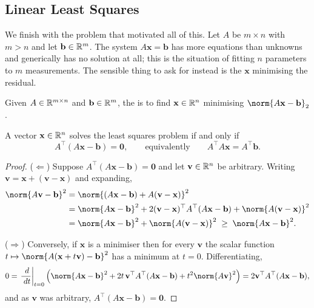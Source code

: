 \documentclass[a4paper]{scrartcl}
\begin{document}
\subsection{Linear Least Squares}

We finish with the problem that motivated all of this. Let $A$ be $m\times n$ with $m > n$ and let $\mathbf b\in\mathbb{R}^m$. The system $A\mathbf x = \mathbf b$ has more equations than unknowns and generically has no solution at all; this is the situation of fitting $n$ parameters to $m$ measurements. The sensible thing to ask for instead is the $\mathbf x$ minimising the residual.

\begin{definition}
  Given $A \in \mathbb{R}^{m\times n}$ and $\mathbf b\in\mathbb{R}^m$, the  is to find $\mathbf x\in\mathbb{R}^n$ minimising $\norm{A\mathbf x - \mathbf b}_2$.
\end{definition}

\begin{theorem}\label{thm:normaleq}
  A vector $\mathbf x\in\mathbb{R}^n$ solves the least squares problem if and only if
  $$
  A^\top(A\mathbf x - \mathbf b) = \mathbf 0, \qquad \text{equivalently} \qquad A^\top A\mathbf x = A^\top \mathbf b .
  $$
\end{theorem}
\begin{proof}
  ($\Leftarrow$) Suppose $A^\top(A\mathbf x - \mathbf b) = \mathbf 0$ and let $\mathbf v\in\mathbb{R}^n$ be arbitrary. Writing $\mathbf v = \mathbf x + (\mathbf v - \mathbf x)$ and expanding,
  \begin{align*}
    \norm{A\mathbf v - \mathbf b}^2 &= \norm{(A\mathbf x - \mathbf b) + A(\mathbf v - \mathbf x)}^2\\
    &= \norm{A\mathbf x - \mathbf b}^2 + 2(\mathbf v - \mathbf x)^\top A^\top(A\mathbf x - \mathbf b) + \norm{A(\mathbf v-\mathbf x)}^2\\
    &= \norm{A\mathbf x - \mathbf b}^2 + \norm{A(\mathbf v - \mathbf x)}^2 \; \geq \; \norm{A\mathbf x - \mathbf b}^2 .
  \end{align*}

  ($\Rightarrow$) Conversely, if $\mathbf x$ is a minimiser then for every $\mathbf v$ the scalar function $t \mapsto \norm{A(\mathbf x + t\mathbf v) - \mathbf b}^2$ has a minimum at $t = 0$. Differentiating,
  $$
  0 = \left.\frac{\dd}{\dd t}\right|_{t=0}\left(\norm{A\mathbf x - \mathbf b}^2 + 2t\,\mathbf v^\top A^\top(A\mathbf x - \mathbf b) + t^2\norm{A\mathbf v}^2\right) = 2\mathbf v^\top A^\top(A\mathbf x - \mathbf b),
  $$
  and as $\mathbf v$ was arbitrary, $A^\top(A\mathbf x-\mathbf b) = \mathbf 0$.
\end{proof}
\end{document}
